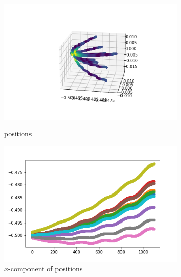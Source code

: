 \documentclass[12pt]{article}
\begin{document}
	\begin{figure}[H]
		\begin{multicols}{2}
			\includegraphics[width=\linewidth, height=6cm]{multips1.png} \caption{positions} \label{multips1} \par
			\includegraphics[width=\linewidth, height=6cm]{multipsx1.png} \caption{$x$-component of positions} \label{multipsx1} \par
		\end{multicols}
	\end{figure}
\end{document}
